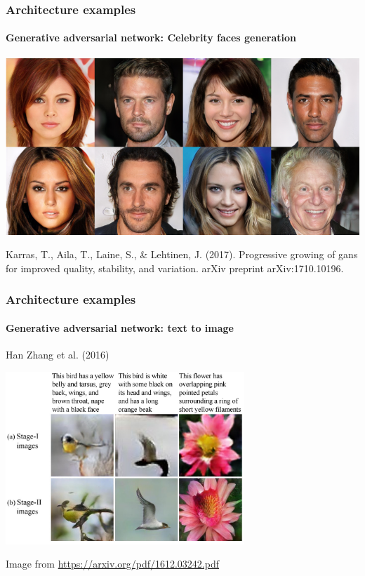 \documentclass[9pt]{beamer}
\begin{document}
\begin{frame}
  \frametitle{Architecture examples}

  \framesubtitle{Generative adversarial network: Celebrity faces generation}

  \begin{center}
    \includegraphics[width=0.7\linewidth]{images/progan.png}
  \end{center}

  \bigskip

  {\footnotesize Karras, T., Aila, T., Laine, S., \& Lehtinen,
    J. (2017). Progressive growing of gans for improved quality,
    stability, and variation. arXiv preprint arXiv:1710.10196.}
\end{frame}

\begin{frame}
  \frametitle{Architecture examples}

  \framesubtitle{Generative adversarial network: text to image}

  Han Zhang et al. (2016)

  \begin{center}
    \includegraphics[width=9cm]{images/GAN_2.jpg}
  \end{center}

  {\small Image from \url{https://arxiv.org/pdf/1612.03242.pdf}}
\end{frame}
\end{document}

